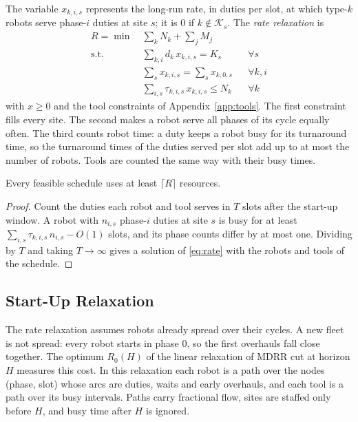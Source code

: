 The variable $x_{k,i,s}$ represents the long-run rate, in duties per slot, at which type-$k$ robots serve phase-$i$ duties at site $s$; it is $0$ if $k \notin \mathcal{K}_s$.
The \emph{rate relaxation} is
\begin{equation}
\begin{aligned}
  R = \min\ & \textstyle\sum_k N_k + \sum_j M_j \\
  \text{s.t. } & \textstyle\sum_{k,i} d_k\, x_{k,i,s} = K_s && \forall s\\
  & \textstyle\sum_s x_{k,i,s} = \sum_s x_{k,0,s} && \forall k, i\\
  & \textstyle\sum_{i,s} \tau_{k,i,s}\, x_{k,i,s} \le N_k && \forall k
\end{aligned}
\label{eq:rate}
\end{equation}
with $x \ge 0$ and the tool constraints of Appendix~\ref{app:tools}.
The first constraint fills every site.
The second makes a robot serve all phases of its cycle equally often.
The third counts robot time: a duty keeps a robot busy for its turnaround time, so the turnaround times of the duties served per slot add up to at most the number of robots.
Tools are counted the same way with their busy times.

\begin{proposition}
\label{prop:rate}
Every feasible schedule uses at least $\lceil R \rceil$ resources.
\end{proposition}

\begin{proof}
Count the duties each robot and tool serves in $T$ slots after the start-up window.
A robot with $n_{i,s}$ phase-$i$ duties at site $s$ is busy for at least $\sum_{i,s} \tau_{k,i,s}\, n_{i,s} - O(1)$ slots, and its phase counts differ by at most one.
Dividing by $T$ and taking $T \to \infty$ gives a solution of \eqref{eq:rate} with the robots and tools of the schedule.
\end{proof}

\subsection{Start-Up Relaxation}
\label{sec:bounds:startup}

The rate relaxation assumes robots already spread over their cycles.
A new fleet is not spread: every robot starts in phase $0$, so the first overhauls fall close together.
The optimum $R_0(H)$ of the linear relaxation of MDRR cut at horizon $H$ measures this cost.
In this relaxation each robot is a path over the nodes (phase, slot) whose arcs are duties, waits and early overhauls, and each tool is a path over its busy intervals.
Paths carry fractional flow, sites are staffed only before $H$, and busy time after $H$ is ignored.

